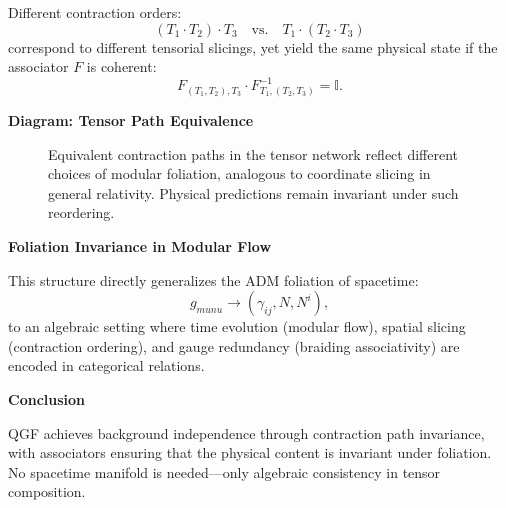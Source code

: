 \documentclass[11pt]{article}
\def\mu{mu}
\def\nu{nu}
\begin{document}
Different contraction orders:
\[
(T_1 \cdot T_2) \cdot T_3 \quad \text{vs.} \quad T_1 \cdot (T_2 \cdot T_3)
\]
correspond to different tensorial slicings, yet yield the same physical state if the associator \( F \) is coherent:
\[
F_{(T_1,T_2),T_3} \cdot F_{T_1,(T_2,T_3)}^{-1} = \mathbb{I}.
\]

\vspace{0.5em}
\noindent\textbf{Diagram: Tensor Path Equivalence}

\begin{figure}[H]
\centering
{}
\caption{Equivalent contraction paths in the tensor network reflect different choices of modular foliation, analogous to coordinate slicing in general relativity. Physical predictions remain invariant under such reordering.}
\label{fig:foliation-equivalence}
\end{figure}

\vspace{0.5em}
\noindent\textbf{Foliation Invariance in Modular Flow}

This structure directly generalizes the ADM foliation of spacetime:
\[
g_{\mu\nu} \rightarrow (\gamma_{ij}, N, N^i),
\]
to an algebraic setting where time evolution (modular flow), spatial slicing (contraction ordering), and gauge redundancy (braiding associativity) are encoded in categorical relations.

\vspace{0.5em}
\noindent\textbf{Conclusion}

QGF achieves background independence through contraction path invariance, with associators ensuring that the physical content is invariant under foliation. No spacetime manifold is needed—only algebraic consistency in tensor composition.
\end{document}
